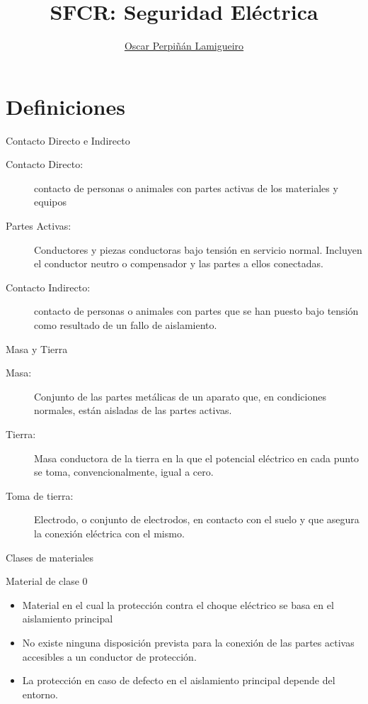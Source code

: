 \documentclass[aspectratio=169, usenames,svgnames,dvipsnames]{beamer}
\author{\href{https://oscarperpinan.github.io}{Oscar Perpiñán Lamigueiro}}
\date{}
\title{SFCR: Seguridad Eléctrica}
\institute[UPM]{Universidad Politécnica de Madrid}
\begin{document}
\maketitle


\section{Definiciones}
\label{sec:org1c102d4}

\begin{frame}[label={sec:org140c101}]{Contacto Directo e Indirecto}
\begin{description}
\item[{Contacto Directo:}] contacto de personas o animales con partes
activas de los materiales y equipos

\item[{Partes Activas:}] Conductores y piezas conductoras bajo tensión en
servicio normal. Incluyen el conductor neutro o compensador y las
partes a ellos conectadas.

\item[{Contacto Indirecto:}] contacto de personas o animales con partes que
se han puesto bajo tensión como resultado de un fallo de aislamiento.
\end{description}
\end{frame}

\begin{frame}[label={sec:org397e4ba}]{Masa y Tierra}
\begin{description}
\item[{Masa:}] Conjunto de las partes metálicas de un aparato que, en
condiciones normales, están aisladas de las partes activas.

\item[{Tierra:}] Masa conductora de la tierra en la que el potencial
eléctrico en cada punto se toma, convencionalmente, igual a cero.

\item[{Toma de tierra:}] Electrodo, o conjunto de electrodos, en contacto
con el suelo y que asegura la conexión eléctrica con el mismo.
\end{description}
\end{frame}

\begin{frame}[label={sec:orgf851906}]{Clases de materiales}
\begin{block}{Material de clase 0}
\begin{itemize}
\item Material en el cual la protección contra el choque eléctrico se basa
en el aislamiento principal
\item No existe ninguna disposición prevista para la conexión de las
partes activas accesibles a un conductor de protección.
\item La protección en caso de defecto en el aislamiento principal depende
del entorno.
\end{itemize}
\end{block}
\end{frame}
\end{document}
